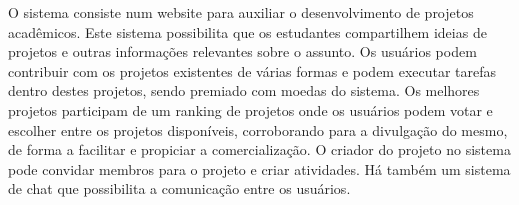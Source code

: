 \begin{apendicesenv}
O sistema consiste num website para auxiliar o desenvolvimento de projetos acadêmicos. Este sistema possibilita que os estudantes compartilhem ideias de projetos e outras informações relevantes sobre o assunto. Os usuários podem contribuir com os projetos existentes de várias formas e podem executar tarefas dentro destes projetos, sendo premiado com moedas do sistema. Os melhores projetos participam de um ranking de projetos onde os usuários podem votar e escolher entre os projetos disponíveis, corroborando para a divulgação do mesmo, de forma a facilitar e propiciar a comercialização. O criador do projeto no sistema pode convidar membros para o projeto e criar atividades. Há também um sistema de chat que possibilita a comunicação entre os usuários.

\end{apendicesenv}
